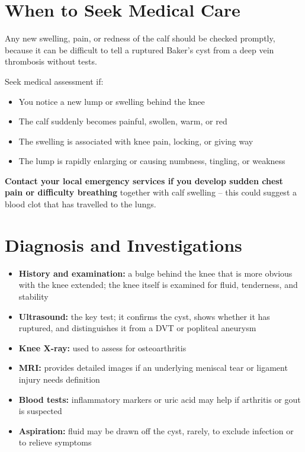 \section*{When to Seek Medical Care}
Any new swelling, pain, or redness of the calf should be checked promptly, because it can be difficult to tell a ruptured Baker's cyst from a deep vein thrombosis without tests.

Seek medical assessment if:
\begin{itemize}
    \item You notice a new lump or swelling behind the knee
    \item The calf suddenly becomes painful, swollen, warm, or red
    \item The swelling is associated with knee pain, locking, or giving way
    \item The lump is rapidly enlarging or causing numbness, tingling, or weakness
\end{itemize}

\textbf{Contact your local emergency services if you develop sudden chest pain or difficulty breathing} together with calf swelling -- this could suggest a blood clot that has travelled to the lungs.

\section*{Diagnosis and Investigations}
\begin{itemize}
    \item \textbf{History and examination:} a bulge behind the knee that is more obvious with the knee extended; the knee itself is examined for fluid, tenderness, and stability
    \item \textbf{Ultrasound:} the key test; it confirms the cyst, shows whether it has ruptured, and distinguishes it from a DVT or popliteal aneurysm
    \item \textbf{Knee X-ray:} used to assess for osteoarthritis
    \item \textbf{MRI:} provides detailed images if an underlying meniscal tear or ligament injury needs definition
    \item \textbf{Blood tests:} inflammatory markers or uric acid may help if arthritis or gout is suspected
    \item \textbf{Aspiration:} fluid may be drawn off the cyst, rarely, to exclude infection or to relieve symptoms
\end{itemize}

